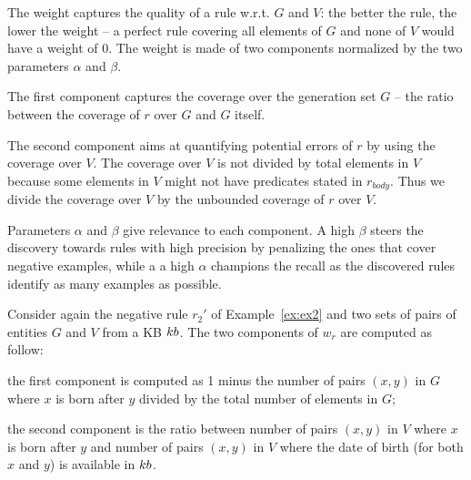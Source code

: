 The weight 
captures the quality of a rule w.r.t. $G$ and $V$: the better the rule, the lower the weight -- a perfect rule covering all elements of $G$ and none of $V$ would have a weight of $0$.
%
The weight is made of two components normalized by the two parameters $\alpha$ and $\beta$.
%
\begin{inparaenum}[\itshape1)]
	\item The first component captures the coverage over the generation set $G$ -- the ratio between the coverage of $r$ over $G$ and $G$ itself. 
	\item The second component aims at quantifying potential errors of $r$ by using the coverage over $V$. The coverage over $V$ is not divided by total elements in $V$ because some elements in $V$ might not have predicates stated in $r_{body}$.
	Thus we divide the coverage over $V$ by the unbounded coverage of $r$ over $V$. 
\end{inparaenum}

Parameters $\alpha$ and $\beta$ give relevance to each component. A high $\beta$ steers the discovery towards rules with high precision by penalizing the ones that cover negative examples, %
while a a high $\alpha$ champions the recall as the discovered rules identify as many examples as possible.

\begin{example}
	Consider again the negative rule $r_2'$ of Example~\ref{ex:ex2} and two sets of pairs of entities $G$ and $V$ from a KB ${\sc kb}$. The two components of $w_r$ are computed as follow:
	\begin{inparaenum}[\itshape1)]
		\item the first component is computed as 1 minus the number of pairs $(x,y)$ in $G$ where
		$x$ is born after $y$ divided by the total number of elements in $G$;
		\item the second component is the ratio between number of pairs $(x,y)$ in $V$ where $x$ is born after $y$ and number of pairs $(x,y)$ in $V$ where the date of birth (for both $x$ and $y$) is available in ${\sc kb}$.
	\end{inparaenum}
\end{example}

